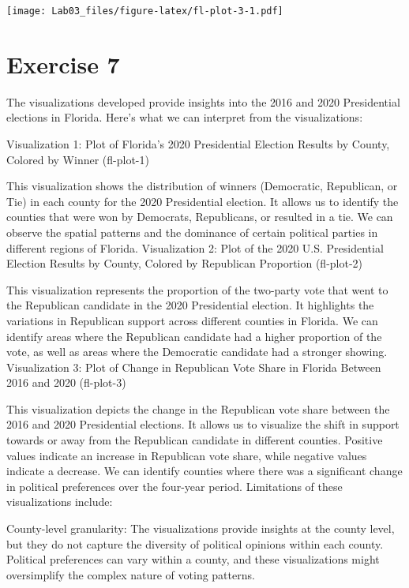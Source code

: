 \documentclass[
]{article}
\begin{document}
\texttt{[image: Lab03\_files/figure-latex/fl-plot-3-1.pdf]}

\hypertarget{exercise-7}{%
\section{Exercise 7}\label{exercise-7}}

The visualizations developed provide insights into the 2016 and 2020
Presidential elections in Florida. Here's what we can interpret from the
visualizations:

Visualization 1: Plot of Florida's 2020 Presidential Election Results by
County, Colored by Winner (fl-plot-1)

This visualization shows the distribution of winners (Democratic,
Republican, or Tie) in each county for the 2020 Presidential election.
It allows us to identify the counties that were won by Democrats,
Republicans, or resulted in a tie. We can observe the spatial patterns
and the dominance of certain political parties in different regions of
Florida. Visualization 2: Plot of the 2020 U.S. Presidential Election
Results by County, Colored by Republican Proportion (fl-plot-2)

This visualization represents the proportion of the two-party vote that
went to the Republican candidate in the 2020 Presidential election. It
highlights the variations in Republican support across different
counties in Florida. We can identify areas where the Republican
candidate had a higher proportion of the vote, as well as areas where
the Democratic candidate had a stronger showing. Visualization 3: Plot
of Change in Republican Vote Share in Florida Between 2016 and 2020
(fl-plot-3)

This visualization depicts the change in the Republican vote share
between the 2016 and 2020 Presidential elections. It allows us to
visualize the shift in support towards or away from the Republican
candidate in different counties. Positive values indicate an increase in
Republican vote share, while negative values indicate a decrease. We can
identify counties where there was a significant change in political
preferences over the four-year period. Limitations of these
visualizations include:

County-level granularity: The visualizations provide insights at the
county level, but they do not capture the diversity of political
opinions within each county. Political preferences can vary within a
county, and these visualizations might oversimplify the complex nature
of voting patterns.
\end{document}
